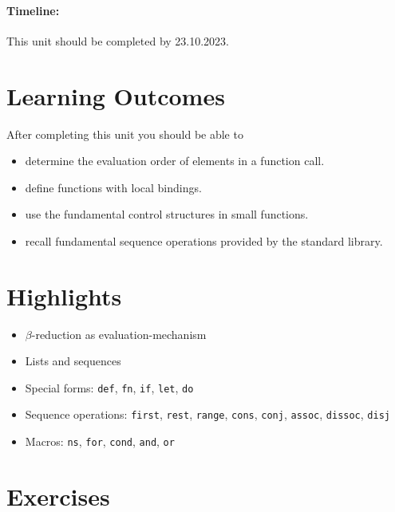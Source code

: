 \documentclass[11pt,a4paper]{article}
\begin{document}
\paragraph{Timeline:} This unit should be completed by 23.10.2023.

\section{Learning Outcomes}

After completing this unit you should be able to

\begin{itemize}
	\item determine the evaluation order of elements in a function call.
    \item define functions with local bindings.
    \item use the fundamental control structures in small functions.
    \item recall fundamental sequence operations provided by the standard library.
\end{itemize}

\section{Highlights}

\begin{itemize}
    \item $\beta$-reduction as evaluation-mechanism
    \item Lists and sequences
    \item Special forms: \verb|def|, \verb|fn|, \verb|if|, \verb|let|, \verb|do|
    \item Sequence operations: \verb|first|, \verb|rest|, \verb|range|, \verb|cons|, \verb|conj|, \verb|assoc|, \verb|dissoc|, \verb|disj|
    \item Macros: \verb|ns|, \verb|for|, \verb|cond|, \verb|and|, \verb|or|
\end{itemize}



\section{Exercises}
\end{document}
